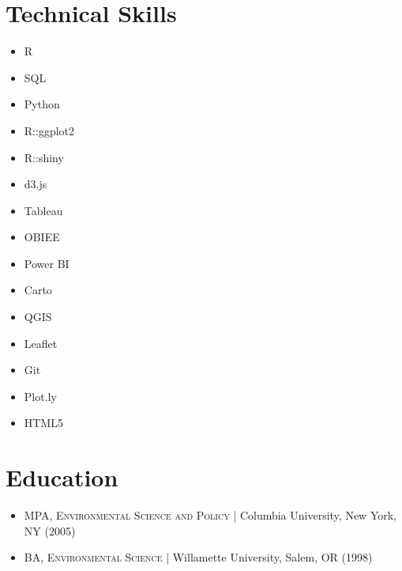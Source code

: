 \documentclass[a4paper,10pt]{article}
\begin{document}
\section{Technical Skills}
    \begin{multicols}{5}
    \begin{itemize}
        \item R
        \item SQL
        \item Python
        \item R::ggplot2
        \item R::shiny
        \item d3.js
        \item Tableau
        \item OBIEE
        \item Power BI
        \item Carto
        \item QGIS
        \item Leaflet
        \item Git
        \item Plot.ly
        \item HTML5
    \end{itemize}
    \end{multicols}
    
\section{Education}
 \begin{itemize}
		\item\textsc{MPA, Environmental Science and Policy} | Columbia University, New York, NY (2005)
		\item\textsc{BA, Environmental Science} | Willamette University, Salem, OR (1998)
	\end{itemize}\vspace{-0.5em}    
\end{document}
